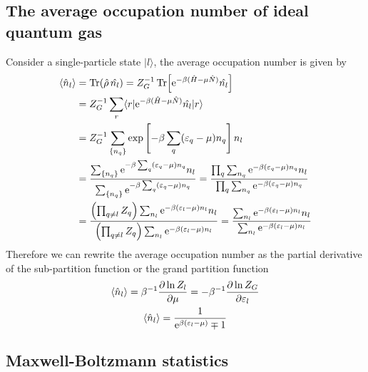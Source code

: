 \documentclass[10pt]{article}
\begin{document}
	\subsection{The average occupation number of ideal quantum gas}

	Consider a single-particle state $| l \rangle$, the average occupation number is given by
	\begin{align*}
		\langle \hat{n}_l \rangle &= \Tr(\hat{\rho}\, \hat{n_l}) = Z_G^{-1} \Tr[{\mathrm{e}}^{-\beta(\hat{H} - \mu \hat{N})} \hat{n_l}] \\
		&= Z_G^{-1} \sum_r \langle r| {\mathrm{e}}^{-\beta(\hat{H} - \mu \hat{N})} \hat{n_l} | r \rangle \\
		&= Z_G^{-1} \sum_{\{ n_q \}} \exp\left[-\beta \sum_q ( \varepsilon_q - \mu)n_q \right] n_l \\
		&= \frac{\sum_{\{ n_q \}} {\mathrm{e}}^{-\beta \sum_q ( \varepsilon_q - \mu)n_q} n_l}{\sum_{\{ n_q \}} {\mathrm{e}}^{-\beta \sum_q ( \varepsilon_q - \mu)n_q}}
		= \frac{\prod_q \sum_{n_q} {\mathrm{e}}^{-\beta (\varepsilon_q - \mu)n_q} n_l}{\prod_q \sum_{n_q} {\mathrm{e}}^{-\beta (\varepsilon_q - \mu)n_q}} \\
		&= \frac{\left(\prod_{q \neq l} Z_q\right) \sum_{n_l} {\mathrm{e}}^{-\beta (\varepsilon_l - \mu)n_l} n_l}{\left(\prod_{q\neq l} Z_q\right) \sum_{n_l} {\mathrm{e}}^{-\beta (\varepsilon_l - \mu)n_l}}
		= \frac{\sum_{n_l} {\mathrm{e}}^{-\beta (\varepsilon_l - \mu)n_l} n_l}{\sum_{n_l} {\mathrm{e}}^{-\beta (\varepsilon_l - \mu)n_l}}
	\end{align*}
	Therefore we can rewrite the average occupation number as the partial derivative of the sub-partition function or the grand partition function
	\begin{gather}
		\langle \hat{n}_l \rangle = \beta^{-1} \frac{\partial \ln Z_l}{\partial \mu} = - \beta^{-1} \frac{\partial \ln Z_G}{\partial \varepsilon_l} \\
		\langle \hat{n}_l \rangle = \frac{1}{{\mathrm{e}}^{\beta(\varepsilon_l - \mu)} \mp 1}
	\end{gather}

	\subsection{Maxwell-Boltzmann statistics}
\end{document}
